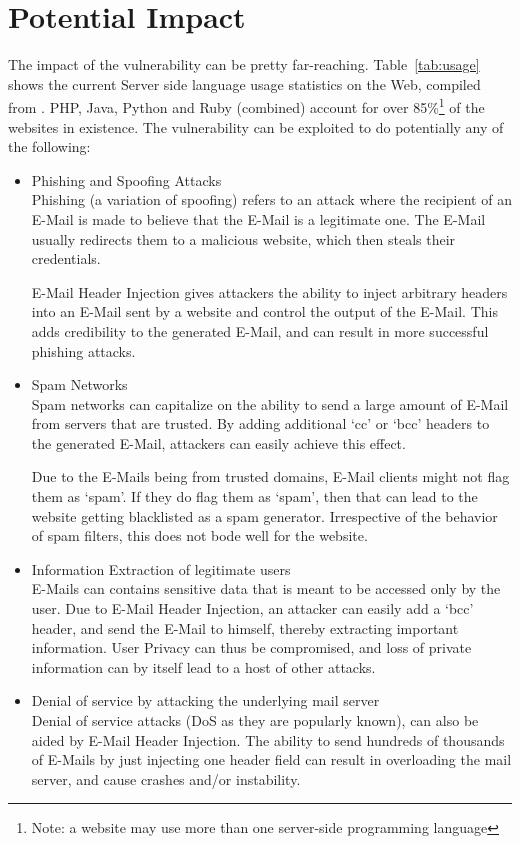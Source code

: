 \section{Potential Impact}

The impact of the vulnerability can be pretty far-reaching.
Table~\ref{tab:usage} shows the current Server side language usage statistics on the Web, compiled from \cite{W3techs}. 
PHP, Java, Python and Ruby (combined) account for over 85\%\footnote{Note: a website may use more than one server-side programming language} of the websites in existence. The vulnerability can be exploited to do potentially any of the following:


\begin{itemize}
	\item Phishing and Spoofing Attacks\\
    Phishing (a variation of spoofing) refers to an attack where the recipient of an E-Mail is made to believe that the E-Mail is a legitimate one. The E-Mail usually redirects them to a malicious website, which then steals their credentials. 
    
    E-Mail Header Injection gives attackers the ability to inject arbitrary headers into an E-Mail sent by a website and control the output of the E-Mail. This adds credibility to the generated E-Mail, and can result in more successful phishing attacks.
	
	\item Spam Networks\\
	Spam networks can capitalize on the ability to send a large amount of E-Mail from servers that are trusted. By adding additional `cc' or `bcc' headers to the generated E-Mail, attackers can easily achieve this effect. 
	
	Due to the E-Mails being from trusted domains, E-Mail clients might not flag them as `spam'. If they do flag them as `spam', then that can lead to the website getting blacklisted as a spam generator. Irrespective of the behavior of spam filters, this does not bode well for the website.
	
	\item Information Extraction of legitimate users\\
	E-Mails can contains sensitive data that is meant to be accessed only by the user. Due to E-Mail Header Injection, an attacker can easily add a `bcc' header, and send the E-Mail to himself, thereby extracting important information.
	User Privacy can thus be compromised, and loss of private information can by itself lead to a host of other attacks.
	
	\item Denial of service by attacking the underlying mail server\\
    Denial of service attacks (DoS as they are popularly known), can also be aided by E-Mail Header Injection. The ability to send hundreds of thousands of E-Mails by just injecting one header field can result in overloading the mail server, and cause crashes and/or instability.
\end{itemize}

